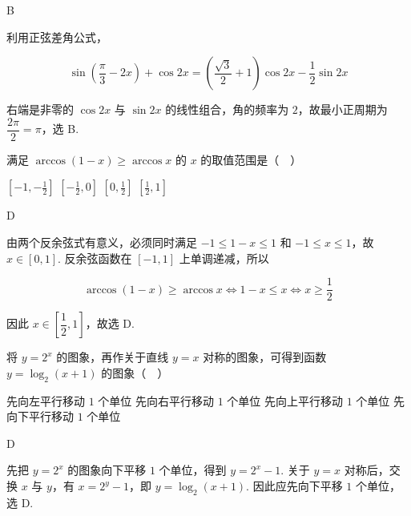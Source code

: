 \documentclass[UTF8,a4paper,oneside,11pt]{ctexbook}
\begin{document}
\begin{answer}
B
\end{answer}

\begin{solution}
利用正弦差角公式，

\[
\sin\left(\frac{\pi}{3}-2x\right)+\cos 2x=\left(\frac{\sqrt{3}}{2}+1\right)\cos 2x-\frac{1}{2}\sin 2x
\]

右端是非零的 \(\cos 2x\) 与 \(\sin 2x\) 的线性组合，角的频率为 \(2\)，故最小正周期为 \(\dfrac{2\pi}{2}=\pi\)，选 B.
\end{solution}

\begin{problem}
满足 \(\arccos(1 - x)\geqslant \arccos x\) 的 \(x\) 的取值范围是（\(\quad\)）

\choices
    {\(\left[-1, -\frac{1}{2}\right]\)}
    {\(\left[-\frac{1}{2},0\right]\)}
    {\(\left[0,\frac{1}{2}\right]\)}
    {\(\left[\frac{1}{2},1\right]\)}
\end{problem}

\begin{answer}
D
\end{answer}

\begin{solution}
由两个反余弦式有意义，必须同时满足 \(-1\leqslant 1-x\leqslant1\) 和 \(-1\leqslant x\leqslant1\)，故 \(x\in[0,1]\). 反余弦函数在 \([-1,1]\) 上单调递减，所以

\[
\arccos(1-x)\geqslant\arccos x\Longleftrightarrow 1-x\leqslant x\Longleftrightarrow x\geqslant\frac12
\]

因此 \(x\in\left[\dfrac12,1\right]\)，故选 D.
\end{solution}

\begin{problem}
将 \(y = 2^x\) 的图象\fillinblank{}，再作关于直线 \(y = x\) 对称的图象，可得到函数 \(y = \log_{2}(x + 1)\) 的图象（\(\quad\)）

\choices
    {先向左平行移动 \(1\) 个单位}
    {先向右平行移动 \(1\) 个单位}
    {先向上平行移动 \(1\) 个单位}
    {先向下平行移动 \(1\) 个单位}
\end{problem}

\begin{answer}
D
\end{answer}

\begin{solution}
先把 \(y=2^{x}\) 的图象向下平移 \(1\) 个单位，得到 \(y=2^{x}-1\). 关于 \(y=x\) 对称后，交换 \(x\) 与 \(y\)，有 \(x=2^{y}-1\)，即 \(y=\log_{2}(x+1)\). 因此应先向下平移 \(1\) 个单位，选 D.
\end{solution}
\end{document}
